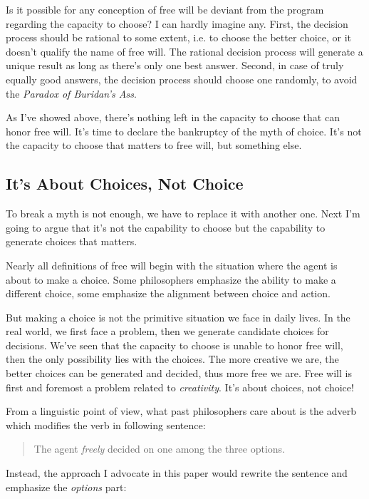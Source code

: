 Is it possible for any conception of free will be deviant from the program regarding the capacity to choose? I can hardly imagine any. First, the decision process should be rational to some extent, i.e. to choose the better choice, or it doesn't qualify the name of free will. The rational decision process will generate a unique result as long as there's only one best answer. Second, in case of truly equally good answers, the decision process should choose one randomly, to avoid the \emph{Paradox of Buridan's Ass}.

As I've showed above, there's nothing left in the capacity to choose that can honor free will. It's time to declare the bankruptcy of the myth of choice. It's not the capacity to choose that matters to free will, but something else.

\subsection{It's About Choices, Not Choice}

To break a myth is not enough, we have to replace it with another one. Next I'm going to argue that it's not the capability to choose but the capability to generate choices that matters.

Nearly all definitions of free will begin with the situation where the agent is about to make a choice. Some philosophers emphasize the ability to make a different choice, some emphasize the alignment between choice and action.

But making a choice is not the primitive situation we face in daily lives. In the real world, we first face a problem, then we generate candidate choices for decisions. We've seen that the capacity to choose is unable to honor free will, then the only possibility lies with the choices. The more creative we are, the better choices can be generated and decided, thus more free we are. Free will is first and foremost a problem related to \emph{creativity}. It's about choices, not choice!

From a linguistic point of view, what past philosophers care about is the adverb which modifies the verb in following sentence:

\begin{quote}
  The agent \emph{freely} decided on one among the three options.
\end{quote}

Instead, the approach I advocate in this paper would rewrite the sentence and emphasize the \emph{options} part:

